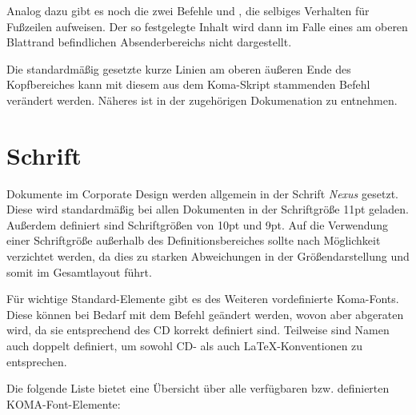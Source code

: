 Analog dazu gibt es noch die zwei Befehle 
und , die selbiges Verhalten für Fußzeilen aufweisen.
Der so festgelegte Inhalt wird dann im Falle eines am oberen Blattrand
befindlichen Absenderbereichs nicht dargestellt.

\begin{Declaration}
\end{Declaration}


Die standardmäßig gesetzte kurze Linien am oberen äußeren Ende des
Kopfbereiches kann mit diesem aus dem Koma-Skript stammenden Befehl verändert
werden. Näheres ist in der zugehörigen Dokumenation zu
entnehmen\cite{koma-skript}.


\section{Schrift}


Dokumente im Corporate Design werden allgemein in der Schrift \emph{Nexus}
gesetzt. Diese wird standardmäßig bei allen Dokumenten in der Schriftgröße
11pt geladen. Außerdem definiert sind Schriftgrößen von 10pt und 9pt.
Auf die Verwendung einer Schriftgröße außerhalb des Definitionsbereiches sollte
nach Möglichkeit verzichtet werden, da dies zu starken Abweichungen in der
Größendarstellung und somit im Gesamtlayout führt.


Für wichtige Standard-Elemente gibt es des Weiteren vordefinierte Koma-Fonts.
Diese können bei Bedarf mit dem Befehl  
geändert werden, wovon aber abgeraten wird, da sie entsprechend des CD korrekt
definiert sind. Teilweise sind Namen auch doppelt definiert, um sowohl
CD- als auch \LaTeX-Konventionen zu entsprechen.

Die folgende Liste bietet eine Übersicht über alle verfügbaren bzw.
definierten KOMA-Font-Elemente:

\begin{desctable}
\end{desctable}



